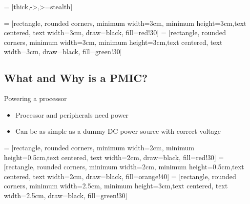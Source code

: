 \documentclass[10pt]{beamer}
\begin{document}

 = [thick,->,>=stealth]

 = [rectangle, rounded corners, minimum width=3cm, minimum height=3cm,text centered, text width=3cm, draw=black, fill=red!30]
 = [rectangle, rounded corners, minimum width=3cm, minimum height=3cm,text centered, text width=3cm, draw=black, fill=green!30]

\addtocounter{framenumber}{-1}
\begin{frame}[plain]
\section{What and Why is a PMIC?}
\end{frame}

\begin{frame}[t]{Powering a processor}\vspace{4pt}

\begin{itemize}
	\item Processor and peripherals need power
	\item Can be as simple as a dummy DC power source with correct voltage
\end{itemize}


\vfill
\centering
\begin{minipage}[c]{.75\textwidth}

\end{minipage}
\end{frame}


 = [rectangle, rounded corners, minimum width=2cm, minimum height=0.5cm,text centered, text width=2cm, draw=black, fill=red!30]
 = [rectangle, rounded corners, minimum width=2cm, minimum height=0.5cm,text centered, text width=2cm, draw=black, fill=orange!40]
 = [rectangle, rounded corners, minimum width=2.5cm, minimum height=3cm,text centered, text width=2.5cm, draw=black, fill=green!30]
\end{document}
